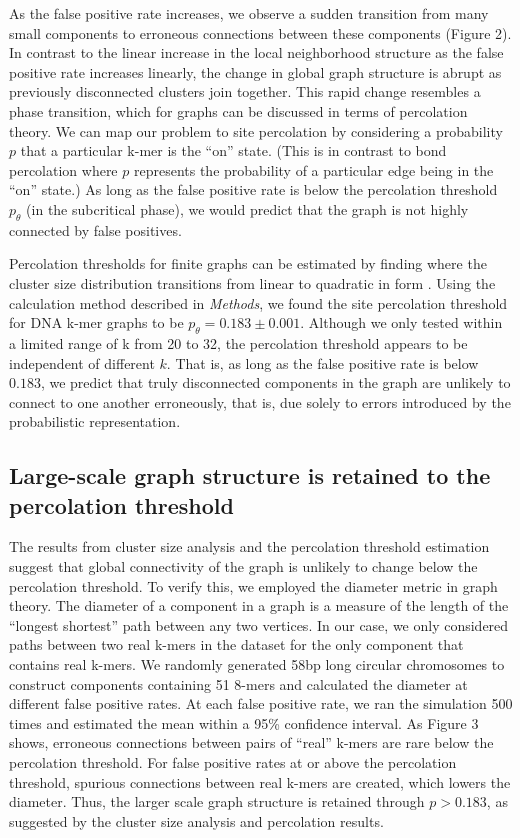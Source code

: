 \documentclass[12pt]{article} \usepackage{simplemargins}
\begin{document}
As the false positive rate increases, we observe a sudden transition
from many small components to erroneous connections between these
components (Figure 2).  In contrast to the linear increase in the
local neighborhood structure as the false positive rate increases
linearly, the change in global graph structure is abrupt as previously
disconnected clusters join together.  This rapid change resembles a
phase transition, which for graphs can be discussed in terms of
percolation theory. We can map our problem to site percolation by
considering a probability $p$ that a particular k-mer is the ``on''
state. (This is in contrast to bond percolation where $p$ represents
the probability of a particular edge being in the ``on'' state.) As
long as the false positive rate is below the percolation threshold
$p_\theta$ (in the subcritical phase), we would predict that the graph
is not highly connected by false positives.


Percolation thresholds for finite graphs can be estimated by finding
where the cluster size distribution transitions from linear to
quadratic in form \cite{stauffer1979scaling}.  Using the calculation
method described in \emph{Methods}, we found the site percolation
threshold for DNA k-mer graphs to be $p_\theta = 0.183 \pm 0.001$.
Although we only tested within a limited range of k from 20 to 32, the
percolation threshold appears to be independent of different $k$.
That is, as long as the false positive rate is below $0.183$, we
predict that truly disconnected components in the graph are unlikely
to connect to one another erroneously, that is, due solely to errors
introduced by the probabilistic representation.

\subsection{Large-scale graph structure is retained to the percolation threshold}

The results from cluster size analysis and the percolation threshold
estimation suggest that global connectivity of the graph is unlikely
to change below the percolation threshold. To verify this, we employed
the diameter metric in graph theory.  The diameter of a component in a
graph is a measure of the length of the ``longest shortest'' path
between any two vertices\cite{bondy2008graph}.  In our case, we only
considered paths between two real k-mers in the dataset for the only
component that contains real k-mers.  We randomly generated 58bp long
circular chromosomes to construct components containing 51 8-mers and
calculated the diameter at different false positive rates. At each
false positive rate, we ran the simulation 500 times and estimated the
mean within a 95\% confidence interval. As Figure 3 shows, erroneous
connections between pairs of ``real'' k-mers are rare below the
percolation threshold. For false positive rates at or above the
percolation threshold, spurious connections between real k-mers are
created, which lowers the diameter.  Thus, the larger scale graph
structure is retained through $p > 0.183$, as suggested by the cluster
size analysis and percolation results.
\end{document}

